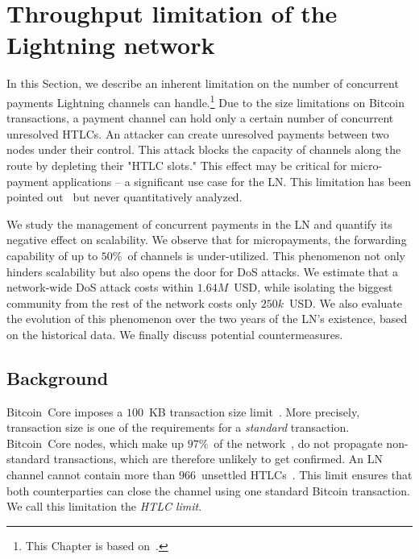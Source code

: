 \chapter{Throughput limitation of the Lightning network}

\label{Chapter08HTLClimit}

In this Section, we describe an inherent limitation on the number of concurrent payments Lightning channels can handle.\footnote{This Chapter is based on~\cite{Tikhomirov2020a}.}
Due to the size limitations on Bitcoin transactions, a payment channel can hold only a certain number of concurrent unresolved HTLCs.
An attacker can create unresolved payments between two nodes under their control.
This attack blocks the capacity of channels along the route by depleting their "HTLC slots."
This effect may be critical for micro-payment applications -- a significant use case for the LN\@.
This limitation has been pointed out~\cite{EmelyanenkoK2017} but never quantitatively analyzed.

We study the management of concurrent payments in the LN and quantify its negative effect on scalability.
We observe that for micropayments, the forwarding capability of up to $50\%$~of channels is under-utilized.
This phenomenon not only hinders scalability but also opens the door for DoS attacks.
We estimate that a network-wide DoS attack costs within $1.64M$~USD, while isolating the biggest community from the rest of the network costs only $250k$~USD\@.
We also evaluate the evolution of this phenomenon over the two years of the LN's existence, based on the historical data.
We finally discuss potential countermeasures.


\section{Background} \label{max-htlc-background}

Bitcoin~Core imposes a $100$~KB transaction size limit~\cite{StandardTxBitcoinSE, BitcoinCoreMaxTxWeight}.
More precisely, transaction size is one of the requirements for a \textit{standard} transaction.
Bitcoin~Core nodes, which make up $97\%$~of the network~\cite{CoinDance}, do not propagate non-standard transactions, which are therefore unlikely to get confirmed.
An LN channel cannot contain more than $966$~unsettled HTLCs~\cite{BOLT2Rationale}.
This limit ensures that both counterparties can close the channel using one standard Bitcoin transaction.
We call this limitation the \textit{HTLC limit}.

